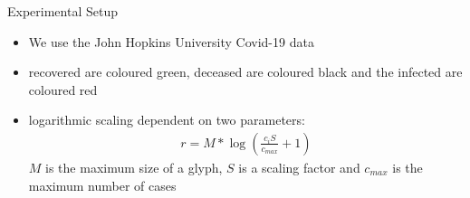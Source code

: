 \documentclass{beamer}
\begin{document}
  \begin{frame}{Experimental Setup}
	\begin{itemize}
		\item We use the John Hopkins University Covid-19 data
		\item recovered are coloured green, deceased are coloured black and 		the infected are coloured red
		\item logarithmic scaling dependent on two parameters:
		\begin{align*}
			r=M* \log \left( \frac{c_i S}{c_{max}} +1 \right)
		\end{align*}
		$M$ is the maximum size of a glyph, $S$ is a scaling factor and $c_{max}$ is 			the maximum number of cases
	\end{itemize}
\end{frame}
  
  
  
\end{document}
